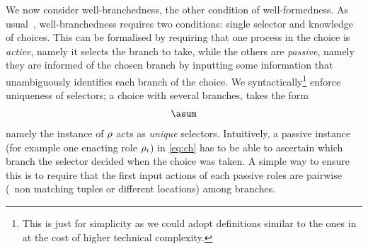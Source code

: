 \bigskip

We now consider well-branchedness, the other condition of
well-formedness.
%
As usual~\cite{gt17}, well-branchedness requires two conditions: single selector
and knowledge of choices.
%
This can be formalised by requiring that one process in the choice is
\emph{active}, namely it selects the branch to take, while the others
are \emph{passive}, namely they are informed of the chosen branch by
inputting some information that unambiguously identifies each branch
of the choice.
%
We syntactically\footnote{This is just for simplicity as we could adopt definitions similar to
  the ones in \cite{gt16,gt17} at the cost of higher technical
  complexity.} enforce uniqueness of selectors; a choice with several branches,
takes the form
\begin{align}
  \asum\label{eq:ch}
\end{align}
namely the instance of $\rho$ acts as \emph{unique} selectors.
%
Intuitively, a passive instance (for example one enacting role
$\rho_i$) in \eqref{eq:ch} has to be able to ascertain which branch
the selector decided when the choice was taken.
%
A simple way to ensure this is to require that the first input actions
of each passive roles are pairwise  (\ie\ non matching
tuples or different locations) among branches.
%

